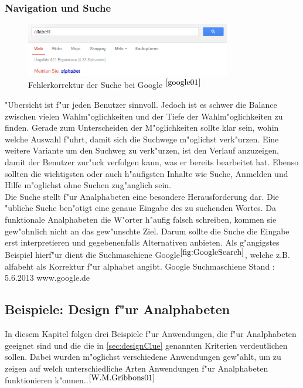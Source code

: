 \subsubsection{Navigation und Suche}
\begin{figure}[h]
	\centering
		\includegraphics[width=0.80\textwidth]{Daten/rechtschreibung.png}
	\caption{Fehlerkorrektur der Suche bei Google $^{\ref{google01}}$}
	\label{fig:GoogleSearch}
\end{figure}

"Ubersicht ist f"ur jeden Benutzer sinnvoll. Jedoch ist es schwer die Balance zwischen vielen Wahlm"oglichkeiten und der Tiefe der Wahlm"oglichkeiten zu finden. Gerade zum Unterscheiden der M"oglichkeiten sollte klar sein, wohin welche Auswahl f"uhrt, damit sich
 die Suchwege m"oglichst verk"urzen. Eine weitere Variante um den Suchweg zu verk"urzen, ist den Verlauf anzuzeigen, damit der Benutzer zur"uck verfolgen kann, was er bereits bearbeitet hat. Ebenso sollten die wichtigsten oder auch h"aufigsten Inhalte wie Suche, Anmelden und Hilfe m"oglichst ohne Suchen zug"anglich sein.\\
Die Suche stellt f"ur Analphabeten eine besondere Herausforderung dar. Die "ubliche Suche ben"otigt eine genaue Eingabe des zu suchenden Wortes. Da funktionale Analphabeten die W"orter h"aufig falsch schreiben, kommen sie gew"ohnlich nicht an das gew"unschte Ziel. Darum sollte die Suche die Eingabe erst interpretieren und gegebenenfalls Alternativen anbieten.
Als g"angigstes Beispiel hierf"ur dient die Suchmaschiene Google$^{\ref{fig:GoogleSearch}}$, welche z.B. \glqq alfabeht\grqq{}  als Korrektur f"ur \glqq alphabet\grqq{}  angibt.
						{Google Suchmaschiene}
						{Stand : 5.6.2013}
						{www.google.de}

\subsection{Beispiele: Design f"ur Analphabeten}
In diesem Kapitel folgen drei Beispiele f"ur Anwendungen, die f"ur Analphabeten geeignet sind und die die in \ref{sec:designClue} genannten Kriterien verdeutlichen sollen. Dabei wurden m"oglichst verschiedene Anwendungen gew"ahlt, um zu zeigen auf welch unterschiedliche Arten Anwendungen f"ur Analphabeten funktionieren k"onnen..$^{\ref{W.M.Gribbons01}}$\\


